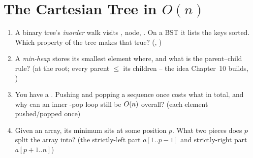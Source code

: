 \section{The Cartesian Tree in $O(n)$}\label{sec:c26-cartesian}

\begin{previouslybox}
\begin{enumerate}[nosep, leftmargin=1.6em]
  \item A binary tree's \emph{inorder} walk visits , node, . On a BST it lists
        the keys sorted. Which property of the tree makes that true? (, )
  \item A \emph{min-heap} stores its smallest element where, and what is the parent--child rule?
        (at the root; every parent $\le$ its children -- the idea Chapter~10 builds, )
  \item You have a . Pushing and popping a sequence once costs what in total, and why can
        an inner -pop loop still be $O(n)$ overall? (each element pushed/popped once)
  \item Given an array, its minimum sits at some position $p$. What two pieces does $p$ split the
        array into? (the strictly-left part $a[1..p-1]$ and strictly-right part $a[p+1..n]$)
\end{enumerate}
\end{previouslybox}

